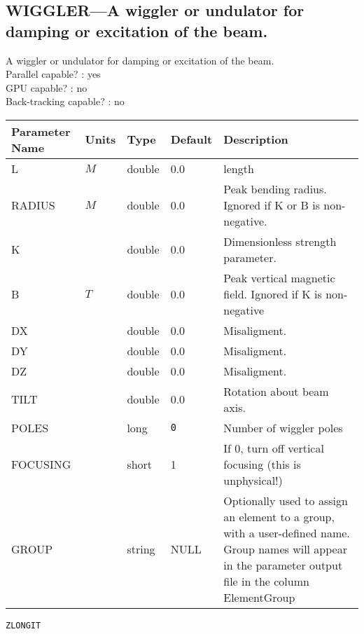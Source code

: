 \subsection{WIGGLER---A wiggler or undulator for damping or excitation of the beam.}
A wiggler or undulator for damping or excitation of the beam.
\\
Parallel capable? : yes\\
GPU capable? : no\\
Back-tracking capable? : no\\
\begin{tabular}{|l|l|l|l|p{\descwidth}|} \hline
Parameter Name & Units & Type & Default & Description \\ \hline 
L & $M$ & double &  0.0 & length  \\ \hline 
RADIUS & $M$ & double &  0.0 & Peak bending radius.  Ignored if K or B is non-negative.  \\ \hline 
K &  & double &  0.0 & Dimensionless strength parameter.  \\ \hline 
B & $T$ & double &  0.0 & Peak vertical magnetic field. Ignored if K is non-negative  \\ \hline 
DX &  & double &  0.0 & Misaligment.  \\ \hline 
DY &  & double &  0.0 & Misaligment.  \\ \hline 
DZ &  & double &  0.0 & Misaligment.  \\ \hline 
TILT &  & double &  0.0 & Rotation about beam axis.  \\ \hline 
POLES &  & long &  \verb|0| & Number of wiggler poles  \\ \hline 
FOCUSING &  & short &   1               & If 0, turn off vertical focusing (this is unphysical!)  \\ \hline 
GROUP &  & string & NULL & Optionally used to assign an element to a group, with a user-defined name.  Group names will appear in the parameter output file in the column ElementGroup  \\ \hline 
\end{tabular}

\vspace*{0.5in}

\newpage
\begin{center}{\Large\verb|ZLONGIT|}\end{center}
